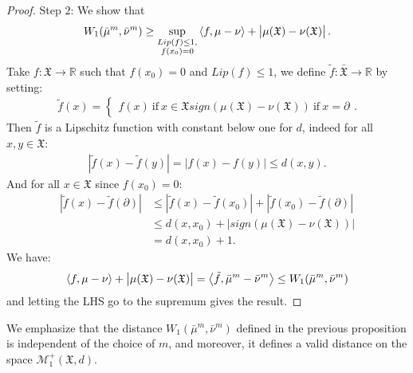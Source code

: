 \documentclass[11pt,a4paper]{article}
\newcommand{\RR}{\mathbb{R}}
\newcommand{\MC}{\mathcal{M}}
\newcommand{\XF}{\mathfrak{X}}
\newcommand{\brac}[1]{\left\langle#1\right\rangle}
\begin{document}
\begin{proof}
    Step $2$: We show that
    \begin{align*}
        W_1(\bar{\mu}^m,\bar{\nu}^m) \geq  \sup\limits_{\substack{Lip(f) \leq 1,\\ f(x_0) = 0}} \brac{f,\mu - \nu} + \left|\vphantom{A^2}\mu(\XF) - \nu(\XF) \right|.
    \end{align*}
    Take $f:\XF \to \RR$ such that $f(x_0) = 0$ and $Lip(f) \leq 1$, we define $\tilde{f}: \bar{\XF}  \to \RR$ by setting:
    \begin{align*}
        \tilde{f}(x) = \left\lbrace
        \begin{aligned}
            f(x)\ \text{if}\ x \in \XF
            sign(\mu(\XF) - \nu(\XF))\ \text{if}\ x = \partial
        \end{aligned}
        \right. .
    \end{align*}
    Then $\tilde{f}$ is a Lipschitz function with constant below one for $d$, indeed for all $x,y \in \XF$:
    \begin{align*}
        \left| \tilde{f}(x) - \tilde{f}(y) \right| = \left| f(x) - f(y) \right| \leq d(x,y).
    \end{align*}
    And for all $x \in \XF$ since $f(x_0)= 0$:
    \begin{align*}
        \left| \tilde{f}(x) - \tilde{f}(\partial) \right| &\leq \left| \tilde{f}(x) - \tilde{f}(x_0) \right| + \left| \tilde{f}(x_0) - \tilde{f}(\partial) \right| \\
        &\leq d(x,x_0) + \left|sign(\mu(\XF) - \nu(\XF)) \right| \\
        &= d(x,x_0) + 1.
    \end{align*}
    We have:
    \begin{align*}
        \brac{f,\mu - \nu} + \left|\vphantom{A^2}\mu(\XF) - \nu(\XF) \right| = \brac{\tilde{f},\bar{\mu}^m - \bar{\nu}^m} \leq W_1(\bar{\mu}^m ,\bar{\nu}^m)
    \end{align*} 
    and letting the LHS go to the supremum gives the result.
\end{proof}
We emphasize that the distance $W_1(\bar{\mu}^m, \bar{\nu}^m)$ defined in the previous proposition is independent of the choice of $m$, and moreover, it defines a valid distance on the space $\MC^+_{1}(\XF,d)$.
\end{document}
